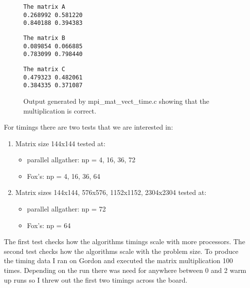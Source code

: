 \documentclass[11pt,a4paper,oneside]{report}
\begin{document}
\begin{figure}[htpb]
  \texttt{The matrix A\\}
  \texttt{0.268992 0.581220 \\}
  \texttt{0.840188 0.394383 \\}

  \texttt{The matrix B\\}
  \texttt{0.089854 0.066885 \\}
  \texttt{0.783099 0.798440 \\}

  \texttt{The matrix C\\}
  \texttt{0.479323 0.482061 \\}
  \texttt{0.384335 0.371087 \\}
  \caption{Output generated by mpi\_mat\_vect\_time.c showing that the multiplication is correct.}
  \label{fig:allgather}
\end{figure}

\pagebreak

For timings there are two tests that we are interested in:
\begin{enumerate}
  \item Matrix size 144x144 tested at:
    \begin{itemize}
      \item parallel allgather: np = 4, 16, 36, 72
      \item Fox’s: np = 4, 16, 36, 64
    \end{itemize}
  \item Matrix sizes 144x144, 576x576, 1152x1152, 2304x2304 tested at:
    \begin{itemize}
      \item parallel allgather: np = 72
      \item Fox’s: np = 64
    \end{itemize}
\end{enumerate}

The first test checks how the algorithms timings scale with more processors.  The second test checks how the algorithms scale with the problem size.  To produce the timing data I ran on Gordon and executed the matrix multiplication 100 times.  Depending on the run there was need for anywhere between 0 and 2 warm up runs so I threw out the first two timings across the board.
\end{document}
